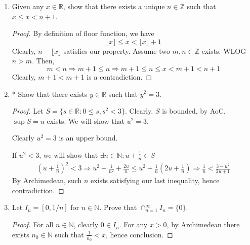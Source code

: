 \begin{enumerate}
\begin{proof}
        Since $u = \sup S$, we have
        \[ u -s < \epsilon_0 \ \epsilon_0 > 0\]
        Moreover, $u+s \le 2u$. Combining these inequalities, we have
        \[ (u-s)(u+s) < 2u\epsilon_0\]
        Then we just choose some $\epsilon > 2u\epsilon_0$.
    \end{proof}
    \begin{proof}[Second proof]
        \[ a = \sup A \Rightarrow a^2 = \sup A \cdot \sup A = \sup A^2 = \sup T \]
    \end{proof}
    \item Given any $x \in \mathbb{R}$, show that there exists a unique $n \in \mathbb{Z}$ such that $x \le x < n+1$.
    \begin{proof}
        By definition of floor function, we have
        \[ \lfloor x \rfloor \le x < \lfloor x \rfloor + 1\]
        Clearly, $n - \lfloor x \rfloor$ satisfies our property. Assume two $m,n \in \mathbb{Z}$ exists. WLOG $n > m$. Then,
        \[ m < n \Rightarrow m+1 \le n \Longrightarrow m+1 \le n \le x < m+1 < n+1\]
        Clearly, $m+1 < m+1$ is a contradiction.
    \end{proof}
    \item* Show that there exists $y \in \mathbb{R}$ such that $y^2 = 3$.
    \begin{proof}
        Let $S = \{ s \in \mathbb{R}: 0 \le s, s^2 < 3\}$. Clearly, $S$ is bounded, by AoC, $\sup S = u$ exists. We will show that $u^2 =3$.

        Clearly $u^2 = 3$ is an upper bound.

        If $u^2<3$, we will show that $\exists n \in \mathbb{N}: u + \frac{1}{n} \in S$
        \begin{align*}
            \left(u + \frac{1}{n} \right)^2 < 3 \Rightarrow u^2 + \frac{1}{n^2} + \frac{2u}{n} \le u^2 + \frac{1}{n}(2u + \frac{1}{n}) \Longrightarrow \frac{1}{n} < \frac{3-u^2}{2u+1}
        \end{align*}
        By Archimedean, such $n$ exists satisfying our last inequality, hence contradiction.

    \end{proof}
\item Let $I_n = [0, 1/n]$ for $n \in \mathbb{N}$. Prove that $\cap_{n=1}^{\infty}I_n = \{ 0\}$.
    \begin{proof}
        For all $n \in \mathbb{N}$, clearly $ 0 \in I_n$. For any $x > 0$, by Archimedean there exists $n_0 \in \mathbb{N}$ such that $\frac{1}{n_0} < x$, hence conclusion.
    \end{proof}
\end{enumerate}
